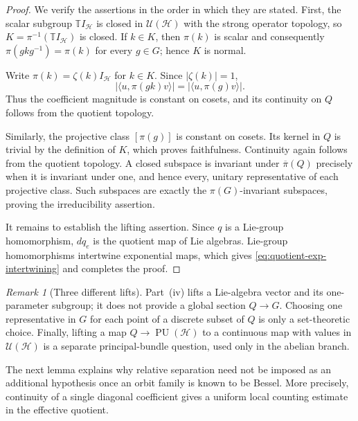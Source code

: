 \documentclass[reqno]{amsart}
\numberwithin{equation}{section}
\theoremstyle{definition}
\theoremstyle{remark}
\newtheorem{remark}[theorem]{Remark}
\newcommand{\cH}{\mathcal H}
\newcommand{\T}{\mathbb T}
\newcommand{\U}{\mathcal U}
\newcommand{\PU}{\operatorname{PU}}
\begin{document}
\begin{proof}
We verify the assertions in the order in which they are stated.  First, the
scalar subgroup $\T I_{\cH}$ is closed in $\U(\cH)$ with the strong
operator topology, so $K=\pi^{-1}(\T I_{\cH})$ is closed.  If $k\in K$,
then $\pi(k)$ is scalar and consequently
$\pi(gkg^{-1})=\pi(k)$ for every $g\in G$; hence $K$ is normal.

Write $\pi(k)=\zeta(k)I_{\cH}$ for $k\in K$.  Since $|\zeta(k)|=1$,
\[
 |\langle u,\pi(gk)v\rangle|
 =|\langle u,\pi(g)v\rangle|.
\]
Thus the coefficient magnitude is constant on cosets, and its
continuity on $Q$ follows from the quotient topology.

Similarly, the projective class $[\pi(g)]$ is constant on cosets.  Its kernel
in $Q$ is trivial by the definition of $K$, which proves faithfulness.
Continuity again follows from the quotient topology.  A closed subspace is
invariant under $\overline\pi(Q)$ precisely when it is invariant under one,
and hence every, unitary representative of each projective class.  Such
subspaces are exactly the $\pi(G)$-invariant subspaces, proving the
irreducibility assertion.

It remains to establish the lifting assertion.  Since $q$ is a Lie-group
homomorphism, $dq_e$ is the quotient map of Lie algebras.  Lie-group
homomorphisms intertwine exponential maps, which gives
\eqref{eq:quotient-exp-intertwining} and completes the proof.
\end{proof}

\begin{remark}[Three different lifts]\label{rem:three-lifts}
Part~(iv) lifts a Lie-algebra vector and its one-parameter subgroup; it does
not provide a global section $Q\to G$.  Choosing one representative in $G$
for each point of a discrete subset of $Q$ is only a set-theoretic choice.
Finally, lifting a map $Q\to\PU(\cH)$ to a continuous map with values in
$\U(\cH)$ is a separate principal-bundle question, used only in the abelian
branch.
\end{remark}

The next lemma explains why relative separation need not be imposed as an
additional hypothesis once an orbit family is known to be Bessel.  More
precisely, continuity of a single diagonal coefficient gives a uniform local
counting estimate in the effective quotient.
\end{document}
